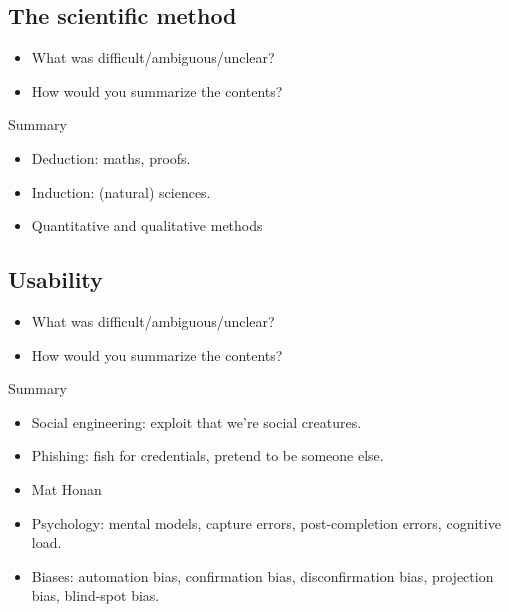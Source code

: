 \subsection{The scientific method}

\begin{frame}
  \begin{question}
    \begin{itemize}
      \item What was difficult/ambiguous/unclear?
      \item How would you summarize the contents?
    \end{itemize}
  \end{question}
\end{frame}

\begin{frame}
  \begin{block}{Summary}
    \begin{itemize}
      \item Deduction: maths, proofs.
      \item Induction: (natural) sciences.
      \item Quantitative and qualitative methods
    \end{itemize}
  \end{block}
\end{frame}

\subsection{Usability}

\begin{frame}
  \begin{question}
    \begin{itemize}
      \item What was difficult/ambiguous/unclear?
      \item How would you summarize the contents?
    \end{itemize}
  \end{question}
\end{frame}

\begin{frame}
  \begin{block}{Summary}
    \begin{itemize}
      \item Social engineering: exploit that we're social creatures.
      \item Phishing: fish for credentials, pretend to be someone else.
      \item Mat Honan
      \item Psychology: mental models, capture errors, post-completion errors, 
        cognitive load.
      \item Biases: automation bias, confirmation bias, disconfirmation bias, 
        projection bias, blind-spot bias.
    \end{itemize}
  \end{block}
\end{frame}


